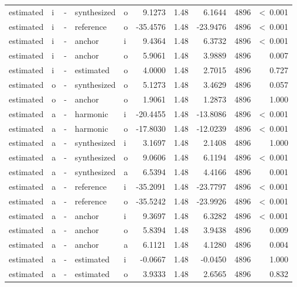 \documentclass[a4paper,man,hidelinks,floatsintext]{apa7}
\begin{document}
\begin{table}[!htbp]
\begin{adjustbox}{max size={\columnwidth}{\textheight}}
\begin{tabular}{llrllrrrrr}
estimated   & i     & - & synthesized & o     &     9.1273 & 1.48 &   6.1644 & 4896 &  \textless~0.001 \\
estimated   & i     & - & reference   & o     &   -35.4576 & 1.48 & -23.9476 & 4896 &  \textless~0.001 \\
estimated   & i     & - & anchor      & i     &     9.4364 & 1.48 &   6.3732 & 4896 &  \textless~0.001 \\
estimated   & i     & - & anchor      & o     &     5.9061 & 1.48 &   3.9889 & 4896 &            0.007 \\
estimated   & i     & - & estimated   & o     &     4.0000 & 1.48 &   2.7015 & 4896 &            0.727 \\
estimated   & o     & - & synthesized & o     &     5.1273 & 1.48 &   3.4629 & 4896 &            0.057 \\
estimated   & o     & - & anchor      & o     &     1.9061 & 1.48 &   1.2873 & 4896 &            1.000 \\
estimated   & a     & - & harmonic    & i     &   -20.4455 & 1.48 & -13.8086 & 4896 &  \textless~0.001 \\
estimated   & a     & - & harmonic    & o     &   -17.8030 & 1.48 & -12.0239 & 4896 &  \textless~0.001 \\
estimated   & a     & - & synthesized & i     &     3.1697 & 1.48 &   2.1408 & 4896 &            1.000 \\
estimated   & a     & - & synthesized & o     &     9.0606 & 1.48 &   6.1194 & 4896 &  \textless~0.001 \\
estimated   & a     & - & synthesized & a     &     6.5394 & 1.48 &   4.4166 & 4896 &            0.001 \\
estimated   & a     & - & reference   & i     &   -35.2091 & 1.48 & -23.7797 & 4896 &  \textless~0.001 \\
estimated   & a     & - & reference   & o     &   -35.5242 & 1.48 & -23.9926 & 4896 &  \textless~0.001 \\
estimated   & a     & - & anchor      & i     &     9.3697 & 1.48 &   6.3282 & 4896 &  \textless~0.001 \\
estimated   & a     & - & anchor      & o     &     5.8394 & 1.48 &   3.9438 & 4896 &            0.009 \\
estimated   & a     & - & anchor      & a     &     6.1121 & 1.48 &   4.1280 & 4896 &            0.004 \\
estimated   & a     & - & estimated   & i     &    -0.0667 & 1.48 &  -0.0450 & 4896 &            1.000 \\
estimated   & a     & - & estimated   & o     &     3.9333 & 1.48 &   2.6565 & 4896 &            0.832 \\
\hline
\end{tabular}
\end{adjustbox}
\begin{tablenotes} {
\small
}
\end{tablenotes}
\end{table}
      
\end{document}
